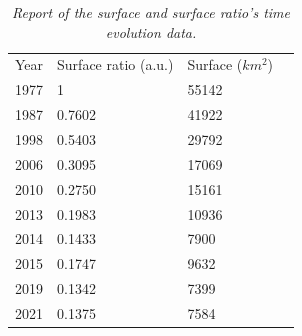 \begin{table}[H]
	\centering
    \begin{tabular}{|l|l|l|l}
    \cline{1-3}
    Year & Surface ratio (a.u.) & Surface ($km^2$) & \\ \cline{1-3}
    1977 & 1                    &            55142 & \\ \cline{1-3}
    1987 & 0.7602               &            41922 & \\ \cline{1-3}
    1998 & 0.5403               &            29792 & \\ \cline{1-3}
    2006 & 0.3095               &            17069 & \\ \cline{1-3}
    2010 & 0.2750               &            15161 & \\ \cline{1-3}
    2013 & 0.1983               &            10936 & \\ \cline{1-3}
    2014 & 0.1433               &             7900 & \\ \cline{1-3}
    2015 & 0.1747               &             9632 & \\ \cline{1-3}
    2019 & 0.1342               &             7399 & \\ \cline{1-3}
    2021 & 0.1375               &             7584 & \\ \cline{1-3}
    \end{tabular}
    \caption{\emph{Report of the surface and surface ratio's time evolution data.}}
    \label{tab:table}
\end{table}
